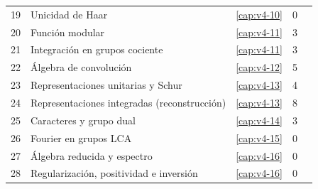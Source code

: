 \begin{longtable}{@{}r>{\raggedright\arraybackslash}p{}rrr@{}}
19 & Unicidad de Haar & \ref{cap:v4-10} & 0 & \pageref{lectura:v4-19}\\
20 & Función modular & \ref{cap:v4-11} & 3 & \pageref{lectura:v4-20}\\
21 & Integración en grupos cociente & \ref{cap:v4-11} & 3 & \pageref{lectura:v4-21}\\
22 & Álgebra de convolución & \ref{cap:v4-12} & 5 & \pageref{lectura:v4-22}\\
23 & Representaciones unitarias y Schur & \ref{cap:v4-13} & 4 & \pageref{lectura:v4-23}\\
24 & Representaciones integradas (reconstrucción) & \ref{cap:v4-13} & 8 & \pageref{lectura:v4-24}\\
25 & Caracteres y grupo dual & \ref{cap:v4-14} & 3 & \pageref{lectura:v4-25}\\
26 & Fourier en grupos LCA & \ref{cap:v4-15} & 0 & \pageref{lectura:v4-26}\\
27 & Álgebra reducida y espectro & \ref{cap:v4-16} & 0 & \pageref{lectura:v4-27}\\
28 & Regularización, positividad e inversión & \ref{cap:v4-16} & 0 & \pageref{lectura:v4-28}\\
\end{longtable}
\normalsize
